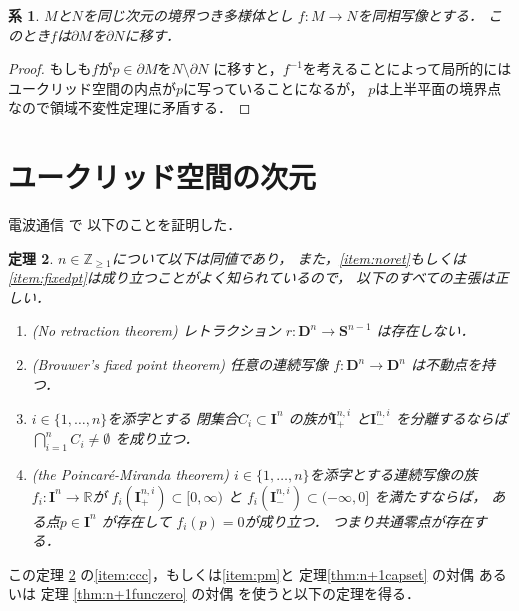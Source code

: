 \documentclass[leqno, a4paper, 12pt]{jsarticle}
\newtheorem{thm}{定理}
\newtheorem{cor}[thm]{系}
\newcommand{\zz}{\mathbb{Z}}
\newcommand{\rr}{\mathbb{R}}
\newcommand{\mydisc}[1]{\mathbf{D}^{#1}}
\newcommand{\mysphere}[1]{\mathbf{S}^{#1}}
\newcommand{\mycube}[1]{\mathbf{I}^{n}}
\newcommand{\mycubesidep}[2]{\mathbf{I}^{#1, #2}_{+}}
\newcommand{\mycubesidem}[2]{\mathbf{I}^{#1, #2}_{-}}
\numberwithin{equation}{section}
\begin{document}
\begin{cor}
$M$と$N$を同じ次元の境界つき多様体とし
$f\colon M\to N$を同相写像とする．
このとき$f$は$\partial M$を$\partial N$に移す．
\end{cor}
\begin{proof}
もしも$f$が$p\in \partial M$を$N\setminus \partial N$
に移すと，$f^{-1}$を考えることによって局所的には
ユークリッド空間の内点が$p$に写っていることになるが，
$p$は上半平面の境界点なので領域不変性定理に矛盾する．
\end{proof}


\section{ユークリッド空間の次元}

電波通信
\cite{dempa2}で
以下のことを証明した．

\begin{thm}\label{thm:zenkaidouchi}
$n\in \zz_{\ge 1}$について以下は同値であり，
また，\ref{item:noret}もしくは
\ref{item:fixedpt}は成り立つことがよく知られているので，
以下のすべての主張は正しい．
\begin{enumerate}[label=\textup{(\arabic*)}]

\item\label{item:noret}(No retraction theorem)
レトラクション
$r\colon \mydisc{n}\to \mysphere{n-1}$
は存在しない．

\item\label{item:fixedpt}(Brouwer's fixed point theorem)
任意の連続写像
$f\colon \mydisc{n}\to \mydisc{n}$
は不動点を持つ．

\item\label{item:ccc}
$i\in \{1, \dots, n\}$を添字とする
閉集合$C_{i}\subset \mycube{n}$
の族が$\mycubesidep{n}{i}$
と$\mycubesidem{n}{i}$
を分離するならば
$\bigcap_{i=1}^{n}C_{i}\neq \emptyset$
を成り立つ．


\item\label{item:pm}(the Poincar\'{e}-Miranda theorem)
$i\in \{1, \dots, n\}$を添字とする連続写像の族
$f_{i}\colon \mycube{n}\to \rr$が
$f_{i}(\mycubesidep{n}{i})\subset [0, \infty)$
と
$f_{i}(\mycubesidem{n}{i})\subset (-\infty, 0]$
を満たすならば，
ある点$p\in \mycube{n}$
が存在して
$f_{i}(p)=0$が成り立つ．
つまり共通零点が存在する．
\end{enumerate}
\end{thm}

この定理
\ref{thm:zenkaidouchi}
の\ref{item:ccc}，もしくは\ref{item:pm}と
定理\ref{thm:n+1capset}
の対偶
あるいは
定理
\ref{thm:n+1funczero}
の対偶
を使うと以下の定理を得る．
\end{document}
